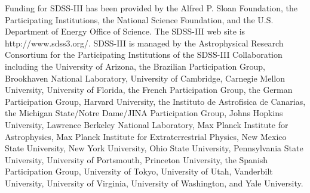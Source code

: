 \documentclass[authoryear, 12pt, 5p, times]{elsarticle}
\begin{document}
Funding for SDSS-III has been provided by the Alfred P. Sloan Foundation, the Participating Institutions, the National Science Foundation, and the U.S. Department of Energy Office of Science. The SDSS-III web site is http://www.sdss3.org/. SDSS-III is managed by the Astrophysical Research Consortium for the Participating Institutions of the SDSS-III Collaboration including the University of Arizona, the Brazilian Participation Group, Brookhaven National Laboratory, University of Cambridge, Carnegie Mellon University, University of Florida, the French Participation Group, the German Participation Group, Harvard University, the Instituto de Astrofisica de Canarias, the Michigan State/Notre Dame/JINA Participation Group, Johns Hopkins University, Lawrence Berkeley National Laboratory, Max Planck Institute for Astrophysics, Max Planck Institute for Extraterrestrial Physics, New Mexico State University, New York University, Ohio State University, Pennsylvania State University, University of Portsmouth, Princeton University, the Spanish Participation Group, University of Tokyo, University of Utah, Vanderbilt University, University of Virginia, University of Washington, and Yale University.



\end{document}
